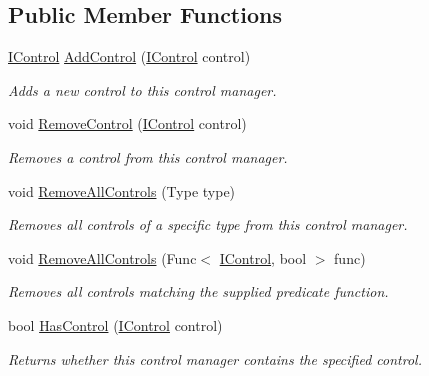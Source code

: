 \subsection*{Public Member Functions}
\begin{DoxyCompactItemize}
\item 
\hyperlink{interface_tri_devs_1_1_tri_engine2_d_1_1_u_i_1_1_i_control}{I\-Control} \hyperlink{interface_tri_devs_1_1_tri_engine2_d_1_1_u_i_1_1_i_control_manager_a6402c9bdd51655809909a5b2df81bd4e}{Add\-Control} (\hyperlink{interface_tri_devs_1_1_tri_engine2_d_1_1_u_i_1_1_i_control}{I\-Control} control)
\begin{DoxyCompactList}\small\item\em Adds a new control to this control manager. \end{DoxyCompactList}\item 
void \hyperlink{interface_tri_devs_1_1_tri_engine2_d_1_1_u_i_1_1_i_control_manager_a84bf915b817eb2cd73effecde76bc503}{Remove\-Control} (\hyperlink{interface_tri_devs_1_1_tri_engine2_d_1_1_u_i_1_1_i_control}{I\-Control} control)
\begin{DoxyCompactList}\small\item\em Removes a control from this control manager. \end{DoxyCompactList}\item 
void \hyperlink{interface_tri_devs_1_1_tri_engine2_d_1_1_u_i_1_1_i_control_manager_ad323233efc2c61c438a6ff6fd166cad4}{Remove\-All\-Controls} (Type type)
\begin{DoxyCompactList}\small\item\em Removes all controls of a specific type from this control manager. \end{DoxyCompactList}\item 
void \hyperlink{interface_tri_devs_1_1_tri_engine2_d_1_1_u_i_1_1_i_control_manager_a2af9d6fa3049272d0fe0c5b6a65de62a}{Remove\-All\-Controls} (Func$<$ \hyperlink{interface_tri_devs_1_1_tri_engine2_d_1_1_u_i_1_1_i_control}{I\-Control}, bool $>$ func)
\begin{DoxyCompactList}\small\item\em Removes all controls matching the supplied predicate function. \end{DoxyCompactList}\item 
bool \hyperlink{interface_tri_devs_1_1_tri_engine2_d_1_1_u_i_1_1_i_control_manager_a5aef292acff7888db032cfdd7a416850}{Has\-Control} (\hyperlink{interface_tri_devs_1_1_tri_engine2_d_1_1_u_i_1_1_i_control}{I\-Control} control)
\begin{DoxyCompactList}\small\item\em Returns whether this control manager contains the specified control. \end{DoxyCompactList}\item 

\end{DoxyCompactItemize}

